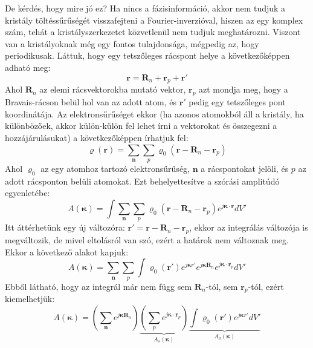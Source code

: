 \documentclass[../main.tex]{subfiles}
\begin{document}
De kérdés, hogy mire jó ez? Ha nincs a fázisinformáció, akkor nem tudjuk a kristály töltéssűrűségét visszafejteni a Fourier-inverzióval, hiszen az egy komplex szám, tehát a kristályszerkezetet közvetlenül nem tudjuk meghatározni.
Viszont van a kristályoknak még egy fontos tulajdonsága, mégpedig az, hogy periodikusak. Láttuk, hogy egy tetszőleges rácspont helye a következőképpen adható meg:
\begin{equation}
    \mathbf{r} = \mathbf{R}_n + \mathbf{r}_p + \mathbf{r}'
\end{equation}
Ahol $\mathbf{R}_n$ az elemi rácsvektorokba mutató vektor, $\mathbf{r}_p$ azt mondja meg, hogy a Bravais-rácson belül hol van az adott atom, és $\mathbf{r}'$ pedig egy tetszőleges pont koordinátája.
Az elektronsűrűséget ekkor (ha azonos atomokból áll a kristály, ha különbözőek, akkor külön-külön fel lehet írni a vektorokat és összegezni a hozzájárulásukat) a következőképpen írhatjuk fel:
\begin{equation}
    \varrho(\mathbf{r}) = \sum_{\mathbf{n}} \sum_{p} \varrho_0(\mathbf{r} - \mathbf{R}_n - \mathbf{r}_p)
\end{equation}
Ahol $\varrho_0$ az egy atomhoz tartozó elektronsűrűség, $\mathbf{n}$ a rácspontokat jelöli, és $p$ az adott rácsponton belüli atomokat. Ezt behelyettesítve a szórási amplitúdó egyenletébe:
\begin{equation}
    A(\boldsymbol{\kappa}) = \int \sum_{\mathbf{n}} \sum_{p} \varrho_0(\mathbf{r} - \mathbf{R}_n - \mathbf{r}_p) e^{j \boldsymbol{\kappa} \cdot \mathbf{r}} d V'
\end{equation}
Itt áttérhetünk egy új változóra: $\mathbf{r}' = \mathbf{r} - \mathbf{R}_n - \mathbf{r}_p$, ekkor az integrálás változója is megváltozik, de mivel eltolásról van szó, ezért a határok nem változnak meg. Ekkor a következő alakot kapjuk:
\begin{equation}
    A(\boldsymbol{\kappa}) = \sum_{\mathbf{n}} \sum_{p} \int \varrho_0(\mathbf{r}') e^{j \boldsymbol{\kappa} r'} e^{j \boldsymbol{\kappa} \mathbf{R}_n } e^{j \boldsymbol{\kappa} \cdot \mathbf{r}_p} d V'
\end{equation}
Ebből látható, hogy az integrál már nem függ sem $\mathbf{R}_n$-tól, sem $\mathbf{r}_p$-tól, ezért kiemelhetjük:
\begin{equation}
    A(\boldsymbol{\kappa}) = \left(\sum_{\mathbf{n}} e^{j \boldsymbol{\kappa} \mathbf{R}_n}\right) \underbrace{\left(\sum_{p} e^{j \boldsymbol{\kappa} \cdot \mathbf{r}_p}\right)}_{A_s(\boldsymbol{\kappa})} \underbrace{\int \varrho_0(\mathbf{r}') e^{j \boldsymbol{\kappa} r'} d V'}_{A_a(\boldsymbol{\kappa})}
\end{equation}
\end{document}
